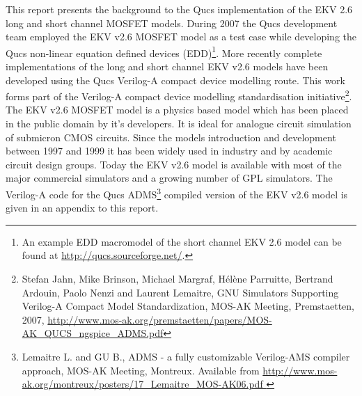 %
%
%
%

\renewcommand{\thesubfigure}{\thefigure(\alph{subfigure})}
\makeatletter
  \renewcommand{\@thesubfigure}{\thesubfigure:\space}
  \renewcommand{\p@subfigure}{}
\makeatother

\renewcommand{\thesubtable}{\thetable(\alph{subtable})}
\makeatletter
  \renewcommand{\@thesubtable}{\thesubtable:\space}
  \renewcommand{\p@subtable}{}
\makeatother


This report presents the background to the Qucs implementation of the
EKV 2.6 long and short channel MOSFET models. During 2007 the Qucs
development team employed the EKV v2.6 MOSFET model as a test case
while developing the Qucs non-linear equation defined devices
(EDD)\footnote{An example EDD macromodel of the short channel EKV 2.6
model can be found at \url{ http://qucs.sourceforge.net/}.}. More
recently complete implementations of the long and short channel EKV
v2.6 models have been developed using the Qucs Verilog-A compact
device modelling route.  This work forms part of the Verilog-A compact
device modelling standardisation initiative\footnote{Stefan Jahn, Mike
Brinson, Michael Margraf, H\'{e}l\`{e}ne Parruitte, Bertrand Ardouin,
Paolo Nenzi and Laurent Lemaitre, GNU Simulators Supporting Verilog-A
Compact Model Standardization, MOS-AK Meeting, Premstaetten, 2007,
\url{http://www.mos-ak.org/premstaetten/papers/MOS-AK_QUCS_ngspice_ADMS.pdf}
}.  The EKV v2.6 MOSFET model is a physics based model which has been
placed in the public domain by it's developers. It is ideal for
analogue circuit simulation of submicron CMOS circuits.  Since the
models introduction and development between 1997 and 1999 it has been
widely used in industry and by academic circuit design groups. Today
the EKV v2.6 model is available with most of the major commercial
simulators and a growing number of GPL simulators. The Verilog-A code
for the Qucs ADMS\footnote{Lemaitre L.  and GU B., ADMS - a fully
customizable Verilog-AMS compiler approach, MOS-AK Meeting,
Montreux. Available from
\url{http://www.mos-ak.org/montreux/posters/17_Lemaitre_MOS-AK06.pdf }
} compiled version of the EKV v2.6 model is given in an appendix to
this report.



